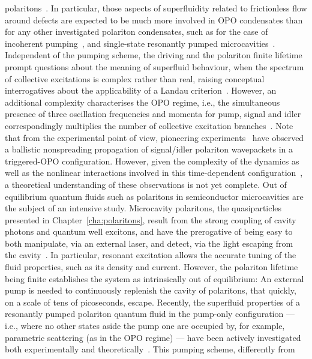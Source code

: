polaritons~\cite{Carusotto_2013}.  In particular, those aspects of
superfluidity related to frictionless flow around defects are expected
to be much more involved in OPO condensates than for any other
investigated polariton condensates, such as for the case of incoherent
pumping~\cite{Kasprzak_2006,Wouters_2010}, and single-state resonantly
pumped microcavities~\cite{Amo_2009}.  Independent of the pumping
scheme, the driving and the polariton finite lifetime prompt questions
about the meaning of superfluid behaviour, when the spectrum of
collective excitations is complex rather than real, raising conceptual
interrogatives about the applicability of a Landau
criterion~\cite{Wouters_2010}.  However, an additional complexity
characterises the OPO regime, i.e., the simultaneous presence of three
oscillation frequencies and momenta for pump, signal and idler
correspondingly multiplies the number of collective excitation
branches~\cite{Wouters_2007}.  Note that from the experimental point
of view, pioneering experiments~\cite{Amo_2009_b} have observed a
ballistic nonspreading propagation of signal/idler polariton
wavepackets in a triggered-OPO configuration.  However, given the
complexity of the dynamics as well as the nonlinear interactions
involved in this time-dependent configuration~\cite{Szyma_ska_2010}, a
theoretical understanding of these observations is not yet complete.
%
Out of equilibrium quantum fluids such as polaritons in semiconductor
microcavities are the subject of an intensive study. Microcavity
polaritons, the quasiparticles presented in
Chapter~\ref{cha:polaritons}, result from the strong coupling of
cavity photons and quantum well excitons, and have the prerogative of
being easy to both manipulate, via an external laser, and detect, via
the light escaping from the cavity~\cite{9780199228942}. In
particular, resonant excitation allows the accurate tuning of the
fluid properties, such as its density and current. However, the
polariton lifetime being finite establishes the system as
intrinsically out of equilibrium: An external pump is needed to
continuously replenish the cavity of polaritons, that quickly, on a
scale of tens of picoseconds, escape.
%
Recently, the superfluid properties of a resonantly pumped polariton
quantum fluid in the pump-only configuration --- i.e., where no other
states aside the pump one are occupied by, for example, parametric
scattering (as in the OPO regime) --- have been actively investigated
both experimentally and theoretically~\cite{Carusotto_2004,
  Ciuti_2005, Amo_2009, Cancellieri_2010, Pigeon_2011, Amo_2011,
  Nardin_2011, Sanvitto_2011}. This pumping scheme, differently from
